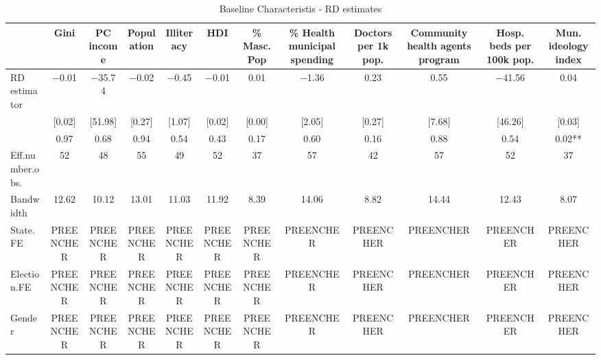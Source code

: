 \begin{table}

\caption{Baseline Characteristis - RD estimates}
\centering
\begin{tabular}[t]{lccccccccccc}
\toprule
  & Gini & PC income & Population & Illiteracy & HDI & \% Masc. Pop & \% Health municipal spending & Doctors per 1k pop. & Community health agents program & Hosp. beds per 100k pop. & Mun. ideology index\\
\midrule
RD estimator & \num{-0.01} & \num{-35.74} & \num{-0.02} & \num{-0.45} & \num{-0.01} & \num{0.01} & \num{-1.36} & \num{0.23} & \num{0.55} & \num{-41.56} & \num{0.04}\\
 & {}[\num{0.02}] & {}[\num{51.98}] & {}[\num{0.27}] & {}[\num{1.07}] & {}[\num{0.02}] & {}[\num{0.00}] & {}[\num{2.05}] & {}[\num{0.27}] & {}[\num{7.68}] & {}[\num{46.26}] & {}[\num{0.03}]\\
 & \num{0.97} & \num{0.68} & \num{0.94} & \num{0.54} & \num{0.43} & \num{0.17} & \num{0.60} & \num{0.16} & \num{0.88} & \num{0.54} & \num{0.02}**\\
\midrule
Eff.number.obs. & 52 & 48 & 55 & 49 & 52 & 37 & 57 & 42 & 57 & 52 & 37\\
Bandwidth & 12.62 & 10.12 & 13.01 & 11.03 & 11.92 & 8.39 & 14.06 & 8.82 & 14.44 & 12.43 & 8.07\\
State.FE & PREENCHER & PREENCHER & PREENCHER & PREENCHER & PREENCHER & PREENCHER & PREENCHER & PREENCHER & PREENCHER & PREENCHER & PREENCHER\\
Election.FE & PREENCHER & PREENCHER & PREENCHER & PREENCHER & PREENCHER & PREENCHER & PREENCHER & PREENCHER & PREENCHER & PREENCHER & PREENCHER\\
Gender & PREENCHER & PREENCHER & PREENCHER & PREENCHER & PREENCHER & PREENCHER & PREENCHER & PREENCHER & PREENCHER & PREENCHER & PREENCHER\\
\bottomrule
\end{tabular}
\end{table}
